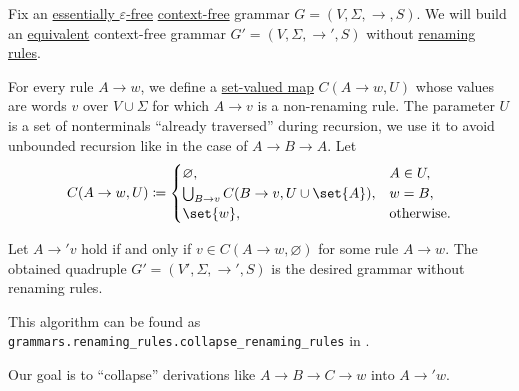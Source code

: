 \begin{algorithm}\label{alg:renaming_rule_collapse}
  Fix an \hyperref[def:epsilon_free_grammar]{essentially \( \varepsilon \)-free} \hyperref[def:chomsky_hierarchy/context_free]{context-free} grammar \( G = (V, \Sigma, \to, S) \). We will build an \hyperref[def:formal_grammar/equivalent]{equivalent} context-free grammar \( G' = (V, \Sigma, \to', S) \) without \hyperref[def:renaming_rule]{renaming rules}.

  \begin{thmenum}
     For every rule \( A \to w \), we define a \hyperref[def:function]{set-valued map} \( C(A \to w, U) \) whose values are words \( v \) over \( V \cup \Sigma \) for which \( A \to v \) is a non-renaming rule. The parameter \( U \) is a set of nonterminals \enquote{already traversed} during recursion, we use it to avoid unbounded recursion like in the case of \( A \to B \to A \). Let
    \begin{equation*}
      C(A \to w, U) \coloneqq \begin{cases}
        \varnothing,                                    &A \in U, \\
        \bigcup_{B \to v} C(B \to v, U \cup \set{ A }), &w = B, \\
        \set{ w },                                      &\T{otherwise.}
      \end{cases}
    \end{equation*}

     Let \( A \to' v \) hold if and only if \( v \in C(A \to w, \varnothing) \) for some rule \( A \to w \). The obtained quadruple \( G' = (V', \Sigma, \to', S) \) is the desired grammar without renaming rules.
  \end{thmenum}
\end{algorithm}
\begin{comments}
  \item This algorithm can be found as \texttt{grammars.renaming\_rules.collapse\_renaming\_rules} in \cite{code}.
  \item Our goal is to \enquote{collapse} derivations like \( A \to B \to C \to w \) into \( A \to' w \).
\end{comments}

